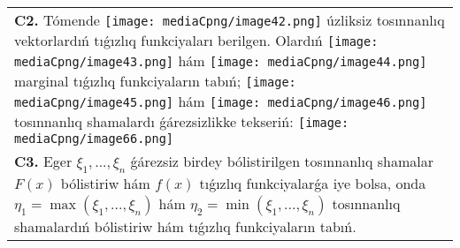 \documentclass{article}
\begin{document}
\begin{tabular}{m{17cm}}
 \\
\textbf{C2.} Tómende \texttt{[image: mediaCpng/image42.png]} úzliksiz tosınnanlıq vektorlardıń tıǵızlıq funkciyaları berilgen. Olardıń \texttt{[image: mediaCpng/image43.png]} hám \texttt{[image: mediaCpng/image44.png]} marginal tıǵızlıq funkciyaların tabıń; \texttt{[image: mediaCpng/image45.png]} hám \texttt{[image: mediaCpng/image46.png]} tosınnanlıq shamalardı ǵárezsizlikke tekseriń: \texttt{[image: mediaCpng/image66.png]}
 \\
\textbf{C3.} Eger \(\xi_{1},...,\xi_{n}\) ǵárezsiz birdey bólistirilgen tosınnanlıq shamalar \(F(x)\) bólistiriw hám \(f(x)\) tıǵızlıq funkciyalarǵa iye bolsa, onda \(\eta_{1} = \max\left( \xi_{1},...,\xi_{n} \right)\) hám \(\eta_{2} = \min\left( \xi_{1},...,\xi_{n} \right)\) tosınnanlıq shamalardıń bólistiriw hám tıǵızlıq funkciyaların tabıń.
 \\

\end{tabular}
\vspace{1cm}
\end{document}
